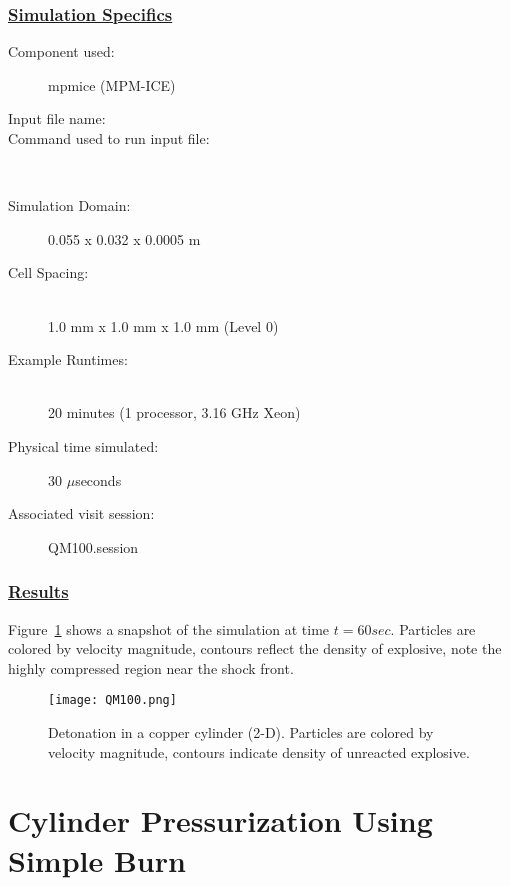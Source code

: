 \subsubsection*{\underline{Simulation Specifics}}
\begin{description}
\item [Component used:] \hfill mpmice (MPM-ICE)
\item [Input file name:] \hfill {}
\item [Command used to run input file:]\hfill \\

\item [Simulation Domain:]\hfill    0.055 x 0.032 x 0.0005 m

\item [Cell Spacing:]\hfill \\
1.0 mm x 1.0 mm x 1.0 mm (Level 0)

\item [Example Runtimes:] \hfill \\
 20 minutes   (1 processor, 3.16 GHz Xeon)\\

\item [Physical time simulated:] \hfill 30 $\mu$seconds

\item [Associated visit session:] \hfill QM100.session

\end{description}

\subsubsection*{\underline{Results}}

Figure~\ref{fig:QM100} shows a snapshot of the simulation at time $t=60sec$.
Particles are colored by velocity magnitude, contours reflect the density of
explosive, note the highly compressed region near the shock front.
\begin{figure}
  \center
  \texttt{[image: QM100.png]}
  \caption{Detonation in a copper cylinder (2-D).  Particles are colored by
           velocity magnitude, contours indicate density of unreacted
           explosive.}
  \label{fig:QM100}
\end{figure}
%
\newpage

\section*{\center  Cylinder Pressurization Using Simple Burn}
